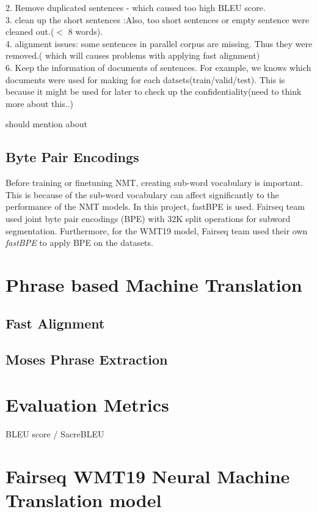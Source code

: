 2. Remove duplicated sentences - which caused too high BLEU score. \\
3. clean up the short sentences :Also, too short sentences or empty sentence were cleaned out.($<$ 8 words). \\
4. alignment issues: some sentences in parallel corpus are missing. Thus they were removed.( which will causes problems with applying fast alignment) \\

6. Keep the information of documents of sentences. For example, we knows which documents were used for making for each datsets(train/valid/test). This is because it might be used for later to check up the confidentiality(need to think more about this..)

should mention about \cite{aulamo-etal-2020-opustools}


\subsection{Byte Pair Encodings}
Before training or finetuning NMT, creating sub-word vocabulary is important. This is because of the sub-word vocabulary can affect significantly to the performance of the NMT models. In this project, fastBPE is used.%
Fairseq team used joint byte pair encodings (BPE) with 32K split operations for subword segmentation. 
Furthermore, for the WMT19 model, Fairseq team used their own \textit{fastBPE} to apply BPE on the datasets. 

\section{Phrase based Machine Translation}
\subsection{Fast Alignment}
\subsection{Moses Phrase Extraction}
\section{Evaluation Metrics}\label{section:evaluation_metrics
}
BLEU score / SacreBLEU 

\section{Fairseq WMT19 Neural Machine Translation model}
